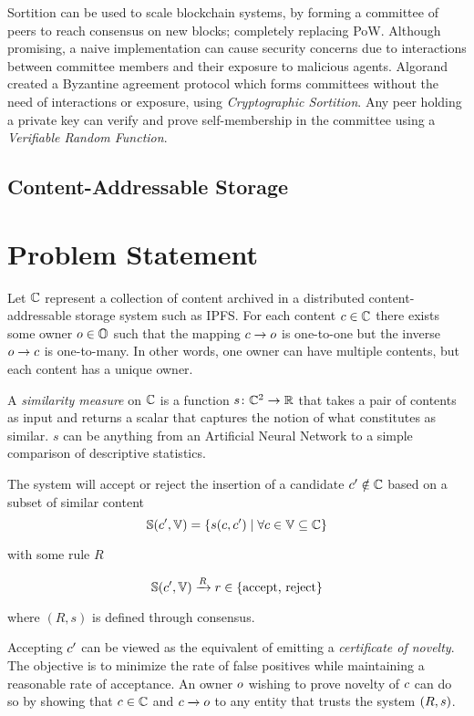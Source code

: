 \documentclass[conference]{IEEEtran}
\begin{document}
Sortition can be used to scale blockchain systems, by forming a committee of peers to reach consensus on new blocks; completely replacing PoW. Although promising, a naive implementation can cause security concerns due to interactions between committee members and their exposure to malicious agents. Algorand created a Byzantine agreement protocol which forms committees without the need of interactions or exposure, using \emph{Cryptographic Sortition}. Any peer holding a private key can verify and prove self-membership in the committee using a \emph{Verifiable Random Function}.

\subsection{Content-Addressable Storage}
\section{Problem Statement}
Let ${{\mathbb{C}}}$ represent a collection of content archived in a distributed content-addressable storage system such as IPFS. For each content ${c} \in {{\mathbb{C}}}$ there exists some owner ${o} \in {{\mathbb{O}}}$ such that the mapping ${c} \to {o}$ is one-to-one but the inverse ${o} \to {c}$ is one-to-many. In other words, one owner can have multiple contents, but each content has a unique owner. 

A \emph{similarity measure} on ${{\mathbb{C}}}$ is a function ${s} \colon {{\mathbb{C}}}^2 \to \mathbb{R}$ that takes a pair of contents as input and returns a scalar that captures the notion of what constitutes as similar. $s$ can be anything from an Artificial Neural Network to a simple comparison of descriptive statistics.

The system will accept or reject the insertion of a candidate ${c}^\prime \notin {{\mathbb{C}}}$ based on a subset of similar content $${\mathbb{S}}({c}^\prime, {\mathbb{V}}) = \left\{ {s}({c},{c}^\prime) \mid \forall {c} \in {\mathbb{V}} \subseteq {{\mathbb{C}}} \right\}$$

with some rule $R$ 

$${\mathbb{S}}({c}^\prime, {\mathbb{V}}) \xrightarrow{R} r \in \text{\{accept, reject\}}$$

where $(R, s)$ is defined through consensus.

Accepting ${c}^\prime$ can be viewed as the equivalent of emitting a \emph{certificate of novelty}. The objective is to minimize the rate of false positives while maintaining a reasonable rate of acceptance. An owner ${o}$ wishing to prove novelty of ${c}$ can do so by showing that ${c} \in {{\mathbb{C}}}$ and ${c} \xrightarrow{} {o}$ to any entity that trusts the system $\left(R, {s} \right)$.
\end{document}
